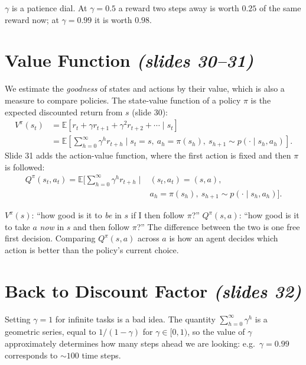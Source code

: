 \documentclass[11pt,a4paper]{article}
\newcommand{\E}{\mathbb{E}}
\newcommand{\slr}[1]{\texorpdfstring{\emph{(slides #1)}}{(slides #1)}}
\theoremstyle{plain}
\theoremstyle{definition}
\theoremstyle{remark}
\begin{document}
\begin{intuition}
$\gamma$ is a patience dial. At $\gamma=0.5$ a reward two steps away is worth $0.25$ of the same reward now; at $\gamma=0.99$ it is worth $0.98$.
\end{intuition}

\section{Value Function \slr{30--31}}
We estimate the \emph{goodness} of states and actions by their value, which is also a measure to compare policies. The state-value function of a policy $\pi$ is the expected discounted return from $s$ (slide 30):
\begin{align*}
  V^\pi(s_t)&=\E\!\left[r_t+\gamma r_{t+1}+\gamma^2r_{t+2}+\cdots\mid s_t\right]\\
  &=\E\!\left[\sum_{h=0}^{\infty}\gamma^hr_{t+h}\;\Big|\;s_t=s,\ a_h=\pi(s_h),\ s_{h+1}\sim p(\cdot\mid s_h,a_h)\right].
\end{align*}
Slide 31 adds the action-value function, where the first action is fixed and then $\pi$ is followed:
\begin{align*}
  Q^\pi(s_t,a_t)=\E\!\Big[\sum_{h=0}^{\infty}\gamma^hr_{t+h}\;\Big|\;&(s_t,a_t)=(s,a),\\
  &a_h=\pi(s_h),\ s_{h+1}\sim p(\cdot\mid s_h,a_h)\Big].
\end{align*}

\begin{intuition}
$V^\pi(s)$: ``how good is it to \emph{be} in $s$ if I then follow $\pi$?'' $Q^\pi(s,a)$: ``how good is it to take $a$ \emph{now} in $s$ and then follow $\pi$?'' The difference between the two is one free first decision. Comparing $Q^\pi(s,a)$ across $a$ is how an agent decides which action is better than the policy's current choice.
\end{intuition}

\section{Back to Discount Factor \slr{32}}
Setting $\gamma=1$ for infinite tasks is a bad idea. The quantity $\sum_{h=0}^\infty\gamma^h$ is a geometric series, equal to $1/(1-\gamma)$ for $\gamma\in[0,1)$, so the value of $\gamma$ approximately determines how many steps ahead we are looking: e.g.\ $\gamma=0.99$ corresponds to ${\sim}100$ time steps.
\end{document}
